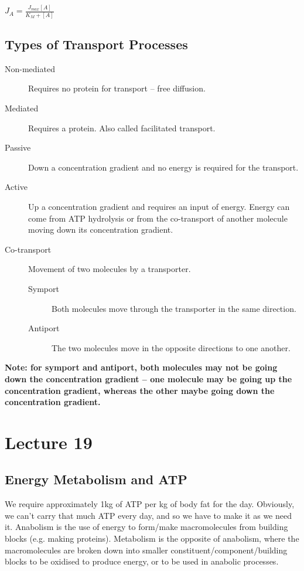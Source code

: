 \documentclass[a4paper, 12pt]{report}
\newcommand{\mychapter}[2]{
    \setcounter{chapter}{#1}
    \setcounter{section}{0}
    \chapter*{#2}
    \addcontentsline{toc}{chapter}{#2}
}
\begin{document}
\begin{center}
\large{$J_A = \frac{J_{max}[A]}{K_M + [A]}$}
\end{center}

\section{Types of Transport Processes}

\begin{description}
\item [Non-mediated] Requires no protein for transport -- free diffusion.
\item [Mediated] Requires a protein. Also called facilitated transport.
\item [Passive] Down a concentration gradient and no energy is required for the transport.
\item [Active] Up a concentration gradient and requires an input of energy. Energy can come from ATP hydrolysis or from the co-transport of another molecule moving down its concentration gradient.
\item [Co-transport] Movement of two molecules by a transporter.
\begin{description}
\item [Symport] Both molecules move through the transporter in the same direction.
\item [Antiport] The two molecules move in the opposite directions to one another.
\end{description}
\end{description}

\vspace{0.5cm}

\noindent
\textbf{Note: for symport and antiport, both molecules may not be going down the concentration gradient -- one molecule may be going up the concentration gradient, whereas the other maybe going down the concentration gradient.}

\mychapter{19}{Lecture 19}

\section{Energy Metabolism and ATP}

We require approximately 1kg of ATP per kg of body fat for the day.
Obviously, we can't carry that much ATP every day, and so we have to make it as we need it.
Anabolism is the use of energy to form/make macromolecules from building blocks (e.g. making proteins).
Metabolism is the opposite of anabolism, where the macromolecules are broken down into smaller constituent/component/building blocks to be oxidised to produce energy, or to be used in anabolic processes.
\end{document}
